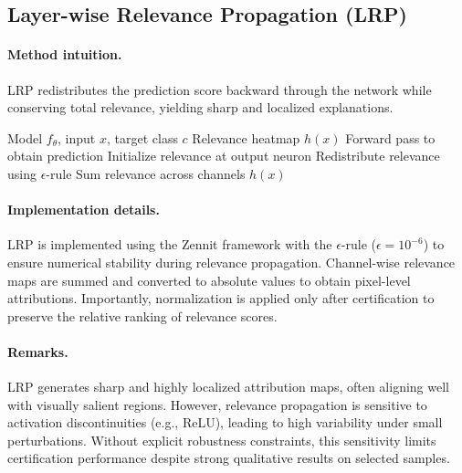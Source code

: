 \documentclass[11pt]{article}
\begin{document}
\subsection{Layer-wise Relevance Propagation (LRP)}

\paragraph{Method intuition.}
LRP redistributes the prediction score backward through the network while conserving total relevance, yielding sharp and localized explanations.

\begin{algorithm}[H]
\caption{Layer-wise Relevance Propagation (LRP)}
\label{alg:lrp}
\begin{algorithmic}[1]
\REQUIRE Model $f_\theta$, input $x$, target class $c$
\ENSURE Relevance heatmap $h(x)$
\STATE Forward pass to obtain prediction
\STATE Initialize relevance at output neuron
    \STATE Redistribute relevance using $\epsilon$-rule
\ENDFOR
\STATE Sum relevance across channels
\RETURN $h(x)$
\end{algorithmic}
\end{algorithm}

\paragraph{Implementation details.}
LRP is implemented using the Zennit framework with the $\epsilon$-rule ($\epsilon = 10^{-6}$) to ensure numerical stability during relevance propagation. Channel-wise relevance maps are summed and converted to absolute values to obtain pixel-level attributions. Importantly, normalization is applied only after certification to preserve the relative ranking of relevance scores.

\paragraph{Remarks.}
LRP generates sharp and highly localized attribution maps, often aligning well with visually salient regions. However, relevance propagation is sensitive to activation discontinuities (e.g., ReLU), leading to high variability under small perturbations. Without explicit robustness constraints, this sensitivity limits certification performance despite strong qualitative results on selected samples.

\end{document}
